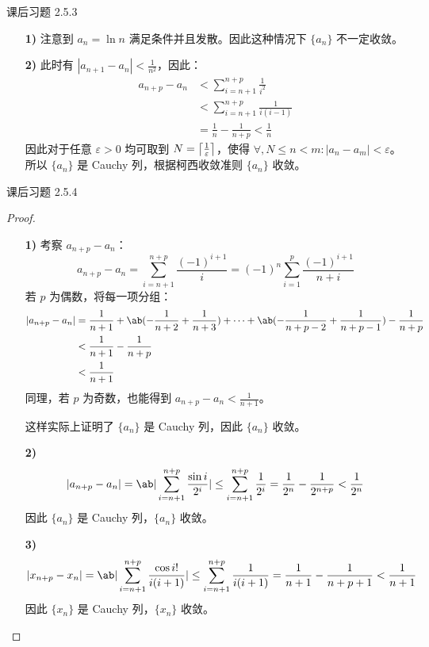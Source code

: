 \begin{problem}
	课后习题 2.5.3

	\begin{solution}
		\begin{enumerate}
			\item[\textbf{1)}] 注意到 $a_n = \ln n$ 满足条件并且发散。因此这种情况下 $\{a_n\}$ 不一定收敛。

			\item[\textbf{2)}] 此时有 $|a_{n+1} - a_n| < \frac{1}{n^2}$，因此：
			$$
			\begin{aligned}
				a_{n+p} - a_n & < \sum_{i=n+1}^{n+p} \frac{1}{i^2} \\
				& < \sum_{i=n+1}^{n+p} \frac{1}{i(i-1)} \\
				& = \frac{1}{n} - \frac{1}{n+p} < \frac{1}{n}
			\end{aligned}
			$$
			因此对于任意 $\varepsilon > 0$ 均可取到 $N = \ceil*{\frac{1}{\varepsilon}}$，使得 $\forall,N \le n < m: |a_n - a_m| < \varepsilon$。所以 $\{a_n\}$ 是 Cauchy 列，根据柯西收敛准则 $\{a_n\}$ 收敛。
		\end{enumerate}
	\end{solution}
\end{problem}

\begin{problem}
	课后习题 2.5.4

	\begin{proof}
		\begin{enumerate}
			\item[\textbf{1)}] 考察 $a_{n+p} - a_n$：
			$$
			a_{n+p} - a_n = \sum_{i=n+1}^{n+p} \frac{(-1)^{i+1}}{i} = (-1)^n \sum_{i=1}^p \frac{(-1)^{i+1}}{n+i}
			$$
			若 $p$ 为偶数，将每一项分组：
			$$
			\begin{aligned}
				|a_{n+p} - a_n| & = \frac{1}{n+1} + \ab(-\frac{1}{n+2} + \frac{1}{n+3}) + \cdots + \ab(-\frac{1}{n+p-2} + \frac{1}{n+p-1}) - \frac{1}{n+p} \\
				& < \frac{1}{n+1} - \frac{1}{n+p} \\
				& < \frac{1}{n+1}
			\end{aligned}
			$$
			同理，若 $p$ 为奇数，也能得到 $a_{n+p} - a_n < \frac{1}{n+1}$。

			这样实际上证明了 $\{a_n\}$ 是 Cauchy 列，因此 $\{a_n\}$ 收敛。

			\item[\textbf{2)}]
			$$
			|a_{n+p} - a_n| = \ab|\sum_{i=n+1}^{n+p} \frac{\sin i}{2^i}| \le \sum_{i=n+1}^{n+p} \frac{1}{2^i} = \frac{1}{2^n} - \frac{1}{2^{n+p}} < \frac{1}{2^n}
			$$
			因此 $\{a_n\}$ 是 Cauchy 列，$\{a_n\}$ 收敛。

			\item[\textbf{3)}]
			$$
			|x_{n+p} - x_n| = \ab|\sum_{i=n+1}^{n+p} \frac{\cos i!}{i(i+1)}| \le \sum_{i=n+1}^{n+p} \frac{1}{i(i+1)} = \frac{1}{n+1} - \frac{1}{n+p+1} < \frac{1}{n+1}
			$$
			因此 $\{x_n\}$ 是 Cauchy 列，$\{x_n\}$ 收敛。
		\end{enumerate}
	\end{proof}
\end{problem}

